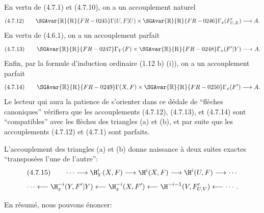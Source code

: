 En vertu de (4.7.1) et (4.7.10), on a un accouplement naturel
\[
(4.7.12)\qquad \SGAvar{\mathbb{R}}{\mathrm{R}}{FR-0245}\Gamma(U,F|U)\times\SGAvar{\mathbb{R}}{\mathrm{R}}{FR-0246}\Gamma_x(F'_{U,X})\longrightarrow A.
\]
En vertu de (4.6.1), on a un accouplement parfait
\[
(4.7.13)\qquad \SGAvar{\mathbb{R}}{\mathrm{R}}{FR-0247}\Gamma_Y(F)\times\SGAvar{\mathbb{R}}{\mathrm{R}}{FR-0248}\Gamma_x(F'|Y)\longrightarrow A.
\]
Enfin, par la formule d'induction ordinaire (1.12 b) (i)), on a un accouplement parfait
\[
(4.7.14)\qquad \SGAvar{\mathbb{R}}{\mathrm{R}}{FR-0249}\Gamma(X,F)\times\SGAvar{\mathbb{R}}{\mathrm{R}}{FR-0250}\Gamma_x(F')\longrightarrow A.
\]
Le lecteur qui aura la patience de s'orienter dans ce dédale de ``flèches canoniques'' vérifiera que les accouplements (4.7.12), (4.7.13), et (4.7.14) sont ``compatibles'' avec les flèches des triangles (a) et (b), et par suite que les accouplements (4.7.12) et (4.7.1) sont parfaits.

L'accouplement des triangles (a) et (b) donne naissance à deux suites exactes ``transposées l'une de l'autre'':
\[
(4.7.15)\qquad \cdots\longrightarrow \H_Y^i(X,F)\longrightarrow\H^i(X,F)\longrightarrow\H^i(U,F)\longrightarrow\cdots
\]
\[
\cdots\longleftarrow \H_x^{-i}(Y,F'|Y)\longleftarrow\H_x^{-i}(X,F')\longleftarrow\H^{-i-1}(V,F'_{U,V})\longleftarrow\cdots.
\]

En résumé, nous pouvons énoncer:

